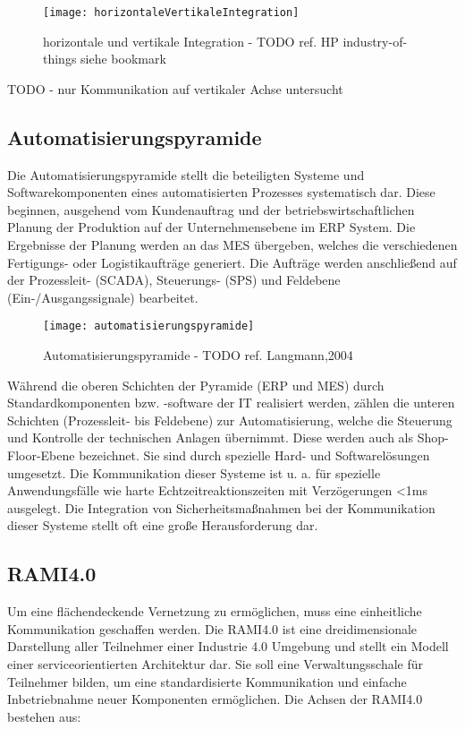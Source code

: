 \begin{figure}[h]
  \centering
  \texttt{[image: horizontaleVertikaleIntegration]}
  \caption{horizontale und vertikale Integration - TODO ref. HP industry-of-things siehe bookmark}
  \label{Kap2:horizontale und vertikale Integration}
\end{figure}

\clearpage

TODO - nur Kommunikation auf vertikaler Achse untersucht

\subsection{Automatisierungspyramide}
Die Automatisierungspyramide stellt die beteiligten Systeme und Softwarekomponenten eines automatisierten Prozesses systematisch dar. Diese beginnen, ausgehend vom Kundenauftrag und der betriebswirtschaftlichen Planung der Produktion auf der Unternehmensebene im \ac{ERP} System. Die Ergebnisse der Planung werden an das \ac{MES} übergeben, welches die verschiedenen Fertigungs- oder Logistikaufträge generiert. Die Aufträge werden anschließend auf der Prozessleit- (\ac{SCADA}), Steuerungs- (\ac{SPS}) und Feldebene (Ein-/Ausgangssignale) bearbeitet.

\begin{figure}[h]
  \centering
  \texttt{[image: automatisierungspyramide]}
  \caption{Automatisierungspyramide - TODO ref. Langmann,2004}
  \label{Kap2:Automatisierungspyramide}
\end{figure}

\clearpage

Während die oberen Schichten der Pyramide (\ac{ERP} und \ac{MES}) durch Standardkomponenten bzw. -software der IT realisiert werden, zählen die unteren Schichten (Prozessleit- bis Feldebene) zur Automatisierung, welche die Steuerung und Kontrolle der technischen Anlagen übernimmt. Diese werden auch als Shop-Floor-Ebene bezeichnet. Sie sind durch spezielle Hard- und Softwarelösungen umgesetzt. Die Kommunikation dieser Systeme ist u. a. für spezielle Anwendungsfälle wie harte Echtzeitreaktionszeiten mit Verzögerungen <1ms ausgelegt. Die Integration von Sicherheitsmaßnahmen bei der Kommunikation dieser Systeme stellt oft eine große Herausforderung dar.

\subsection{\ac{RAMI4.0}}
Um eine flächendeckende Vernetzung zu ermöglichen, muss eine einheitliche Kommunikation geschaffen werden. Die \ac{RAMI4.0} ist eine dreidimensionale Darstellung aller Teilnehmer einer Industrie 4.0 Umgebung und stellt ein Modell einer serviceorientierten Architektur dar. Sie soll eine Verwaltungsschale für Teilnehmer bilden, um eine standardisierte Kommunikation und einfache Inbetriebnahme neuer Komponenten ermöglichen. \cite{rami2016} Die Achsen der \ac{RAMI4.0} bestehen aus:

